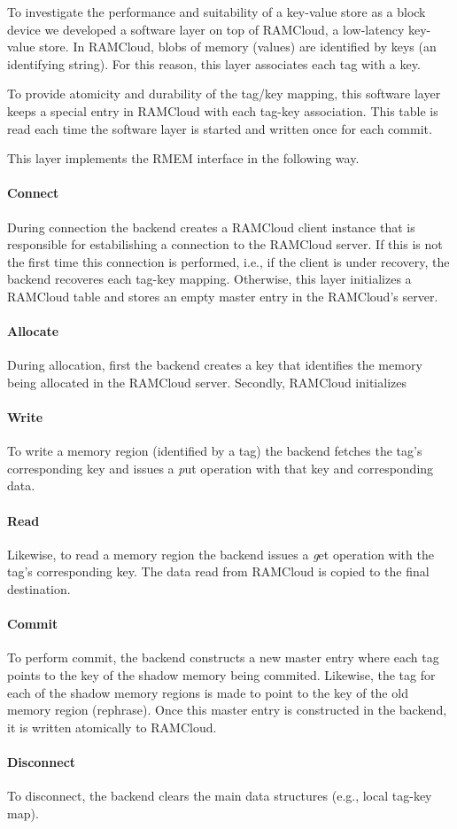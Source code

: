 
To investigate the performance and suitability of a key-value store as a block device we developed a software layer on top of RAMCloud, a low-latency key-value store.
In RAMCloud, blobs of memory (values) are identified by keys (an identifying string). For this reason, this layer associates each tag with a key.

To provide atomicity and durability of the tag/key mapping, this software layer keeps a special entry in RAMCloud with each tag-key association. This table is read each time the software layer is started and written once for each commit.

This layer implements the RMEM interface in the following way. 

\paragraph {\bf Connect} During connection the backend creates a RAMCloud client instance that is responsible for estabilishing a connection to the RAMCloud server.
If this is not the first time this connection is performed, i.e., if the client is under recovery, the backend recoveres each tag-key mapping.
Otherwise, this layer initializes a RAMCloud table and stores an empty master entry in the RAMCloud's server.
\paragraph{\bf Allocate} During allocation, first the backend creates a key that identifies the memory being allocated in the RAMCloud server. Secondly, RAMCloud initializes
\paragraph{\bf Write} To write a memory region (identified by a tag) the backend fetches the tag's corresponding key and issues a {\emph put } operation with that key and corresponding data.
\paragraph{\bf Read} Likewise, to read a memory region the backend issues a {\emph get} operation with the tag's corresponding key. The data read from RAMCloud is copied to the final destination.
\paragraph{\bf Commit} To perform commit, the backend constructs a new master entry where each tag points to the key of the shadow memory being commited. Likewise, the tag for each of the shadow
memory regions is made to point to the key of the old memory region (rephrase). Once this master entry is constructed in the backend, it is written atomically to RAMCloud.
\paragraph{\bf Disconnect} To disconnect, the backend clears the main data structures (e.g., local tag-key map).



